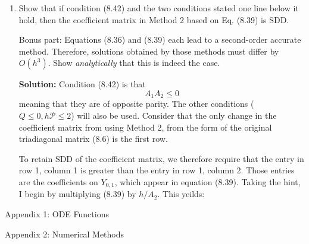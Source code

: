 \documentclass[11pt]{article}
\newcommand{\oh}[1]{O(h^{{#1}})}
\begin{document}
\begin{enumerate}
\item Show that if condition (8.42) and the two conditions stated one line below it hold, then the coefficient matrix in Method 2 based on Eq. (8.39) is SDD.

Bonus part: Equations (8.36) and (8.39) each lead to a second-order accurate method.
Therefore, solutions obtained by those methods must differ by $\oh{3}$.
Show {\em analytically} that this is indeed the case.

\bigskip
\textbf{Solution:} Condition (8.42) is that 
\[ A_1 A_2 \leq 0 \]
meaning that they are of opposite parity.
The other conditions ($Q \leq 0, h\mathcal{P} \leq 2$) will also be used.
Consider that the only change in the coefficient matrix from using Method 2, from the form of the original triadiagonal matrix (8.6) is the first row.

To retain SDD of the coefficient matrix, we therefore require that the entry in row 1, column 1 is greater than the entry in row 1, column 2.
Those entries are the coefficients on $Y_{0,1}$, which appear in equation (8.39).
Taking the hint, I begin by multiplying (8.39) by $h/A_2$.
This yeilds:


\end{enumerate}

\clearpage
\pagebreak
{\huge Appendix 1: ODE Functions}

\clearpage
\pagebreak
{\huge Appendix 2: Numerical Methods}

\end{document}
